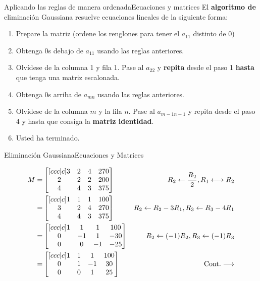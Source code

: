 \documentclass[spanish, c]{beamer}
\begin{document}
\begin{frame}{Aplicando las reglas de manera ordenada}{Ecuaciones y matrices}
    El \textbf{algoritmo de} \alert{eliminación Gaussiana} resuelve ecuaciones lineales de la siguiente forma:

    \begin{enumerate}
        \item Prepare la matriz (ordene los  renglones para tener el $a_{11}$ distinto de 0)
        \item Obtenga 0s debajo de $a_{11}$ usando las reglas anteriores.
        \item Olvídese de la columna 1 y fila 1. Pase al $a_{22}$ y \textbf{repita} desde el paso 1 \textbf{hasta} que tenga una \alert{matriz escalonada}.
        \item Obtenga 0s arriba de $a_{mn}$ usando las reglas anteriores.
        \item Olvídese de la columna $m$ y la fila $n$. Pase al $a_{m-1n-1}$ y repita desde el paso 4 y hasta que consiga la \textbf{matriz identidad}.
        \item Usted ha terminado.
    \end{enumerate}

\end{frame}

\begin{frame}{Eliminación Gaussiana}{Ecuaciones y Matrices}

    \begin{align*}
        M =
    & \begin{bmatrix}[ccc|c]
        3 & 2 & 4 & 270 \\
        2 & 2 & 2 & 200 \\
        4 & 4 & 3 & 375
    \end{bmatrix}
    & \hfill R_2 \gets \frac{R_2}{2}, R_1 \longleftrightarrow R_2 \\
    = & \begin{bmatrix}[ccc|c]
        1 & 1 & 1 & 100 \\
        3 & 2 & 4 & 270 \\
        4 & 4 & 3 & 375
    \end{bmatrix}
    & R_2 \gets R_2 - 3R_1, R_3 \gets R_3 - 4R_1 \\
    = & \begin{bmatrix}[ccc|c]
        1 & 1 & 1 & 100 \\
        0 & -1 & 1 & -30 \\
        0 & 0 & -1 & -25
    \end{bmatrix}
    & R_2 \gets (-1)R_2, R_3 \gets (-1)R_3 \\
    = & \begin{bmatrix}[ccc|c]
        1 & 1 & 1 & 100 \\
        0 & 1 & -1 & 30 \\
        0 & 0 & 1 & 25
    \end{bmatrix}
    & \text{Cont.} \longrightarrow
    \end{align*}
\end{frame}
\end{document}
